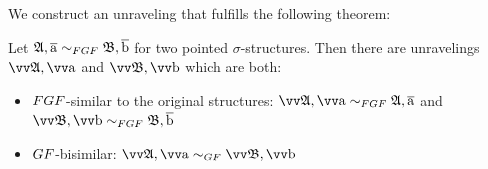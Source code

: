 We construct an unraveling that fulfills the following theorem:
\begin{theorem}
  Let $\str{A}, \elemtuplea \bisimto_{\FGF} \str{B}, \elemtupleb$ for two pointed $\sigma$-structures.
  Then there are unravelings $\unravel{A}, \elemtuptuplea$ and $\unravel{B}, \elemtuptupleb$ which are both:
  \begin{itemize}
    \item $\FGF$-similar to the original structures: $\unravel{A}, \elemtuptuplea \bisimto_{\FGF} \str{A}, \elemtuplea$ and $\unravel{B}, \elemtuptupleb \bisimto_{\FGF} \str{B}, \elemtupleb$
    \item $\GF$-bisimilar: $\unravel{A}, \elemtuptuplea \bisimto_{\GF} \unravel{B}, \elemtuptupleb$
  \end{itemize}
\end{theorem}

